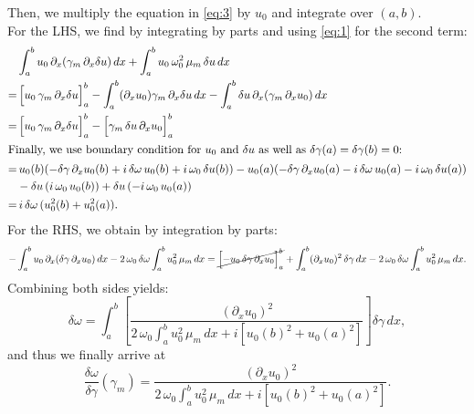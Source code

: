 Then, we multiply the equation in \eqref{eq:3} by $u_0$ and integrate over $(a,b)$.\\
For the LHS, we find by integrating by parts and using \eqref{eq:1} for the second term:
\begin{align*}
    &\int_a^b u_0 \, \partial_x (\gamma_m \, \partial_x \delta u)\, dx + \int_a^b u_0 \, \omega_0^2 \, \mu_m \, \delta u \, dx \\
    =&\left[ u_0 \, \gamma_m \, \partial_x \delta u \vphantom{\frac{a}{b}}\right]_a^b - \int_a^b (\partial_x u_0) \gamma_m\, \partial_x \delta u \, dx - \int_a^b \delta u \, \partial_x(\gamma_m \, \partial_x u_0) \, dx \\
    =&\left[ u_0 \,  \gamma_m \, \partial_x \delta u \vphantom{\frac{a}{b}}\right]_a^b - \left[\gamma_m \,\delta u \, \partial_x u_0 \vphantom{\frac{a}{b}} \right]_a^b\\
    \intertext{Finally, we use boundary condition for $u_0$ and $\delta u$ as well as $\delta \gamma(a) = \delta \gamma(b) = 0$:}
    =& \, u_0(b) (- \delta \gamma \, \partial_x u_0(b) + i \, \delta \omega \, u_0(b) + i\, \omega_0 \, \delta u(b))
    - u_0(a) (-\delta \gamma \, \partial_x u_0(a) -i\, \delta \omega \, u_0(a) - i\, \omega_0 \, \delta u(a))\\
    &- \delta u \, (i \, \omega_0 \, u_0(b)) + \delta u \, (-i \, \omega_0 \, u_0(a))\\
    =&\,  i \, \delta \omega \, (u_0^2(b) + u_0^2(a)).
\end{align*}
For the RHS, we obtain by integration by parts:
\begin{align*}
    -\int_a^b u_0 \, \partial_x(\delta \gamma \, \partial_x u_0)\, dx - 2\, \omega_0 \, \delta \omega \int_a^b u_0^2 \, \mu_m \, dx = \cancel{\left[-u_0 \, \delta \gamma \, \partial_x u_0 \vphantom{\frac{a}{b}} \right]_a^b} + \int_a^b (\partial_x u_0)^2 \, \delta \gamma \, dx - 2\, \omega_0 \, \delta \omega \int_a^b u_0^2 \, \mu_m \, dx.
\end{align*}
Combining both sides yields:
\begin{equation*}
    \delta \omega = \int_a^b \left[\frac{(\partial_x u_0)^2}{2 \, \omega_0 \int_a^b u_0^2 \, \mu_m \, dx + i \left[u_0(b)^2 + u_0(a)^2\right]} \right] \delta \gamma \, dx,
\end{equation*}
and thus we finally arrive at
\begin{equation}
    \frac{\delta \omega}{\delta \gamma}(\gamma_m) = \frac{(\partial_x u_0)^2}{2 \, \omega_0 \int_a^b u_0^2 \, \mu_m \, dx + i \left[u_0(b)^2 + u_0(a)^2\right]}.
\end{equation}
